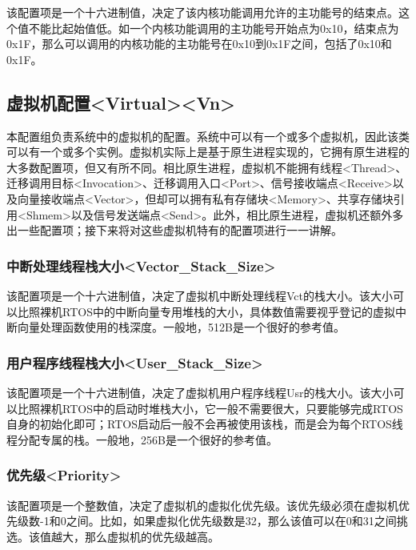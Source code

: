 该配置项是一个十六进制值，决定了该内核功能调用允许的主功能号的结束点。这个值不能比起始值低。如一个内核功能调用的主功能号开始点为0x10，结束点为0x1F，那么可以调用的内核功能的主功能号在0x10到0x1F之间，包括了0x10和0x1F。

\subsection{虚拟机配置<Virtual><Vn>{}}\label{subsec:5-3-15}

本配置组负责系统中的虚拟机的配置。系统中可以有一个或多个虚拟机，因此该类可以有一个或多个实例。虚拟机实际上是基于原生进程实现的，它拥有原生进程的大多数配置项，但又有所不同。相比原生进程，虚拟机不能拥有线程<Thread>、迁移调用目标<Invocation>、迁移调用入口<Port>、信号接收端点<Receive>以及向量接收端点<Vector>，但却可以拥有私有存储块<Memory>、共享存储块引用<Shmem>以及信号发送端点<Send>。此外，相比原生进程，虚拟机还额外多出一些配置项；接下来将对这些虚拟机特有的配置项进行一一讲解。

\subsubsection{中断处理线程栈大小<Vector\_Stack\_Size>{}}\label{subsubsec:5-3-15-1}

该配置项是一个十六进制值，决定了虚拟机中断处理线程Vct的栈大小。该大小可以比照裸机RTOS中的中断向量专用堆栈的大小，具体数值需要视乎登记的虚拟中断向量处理函数使用的栈深度。一般地，512B是一个很好的参考值。

\subsubsection{用户程序线程栈大小<User\_Stack\_Size>{}}\label{subsubsec:5-3-15-2}

该配置项是一个十六进制值，决定了虚拟机用户程序线程Usr的栈大小。该大小可以比照裸机RTOS中的启动时堆栈大小，它一般不需要很大，只要能够完成RTOS自身的初始化即可；RTOS启动后一般不会再被使用该栈，而是会为每个RTOS线程分配专属的栈。一般地，256B是一个很好的参考值。

\subsubsection{优先级<Priority>{}}\label{subsubsec:5-3-15-3}

该配置项是一个整数值，决定了虚拟机的虚拟化优先级。该优先级必须在虚拟机优先级数-1和0之间。比如，如果虚拟化优先级数是32，那么该值可以在0和31之间挑选。该值越大，那么虚拟机的优先级越高。

